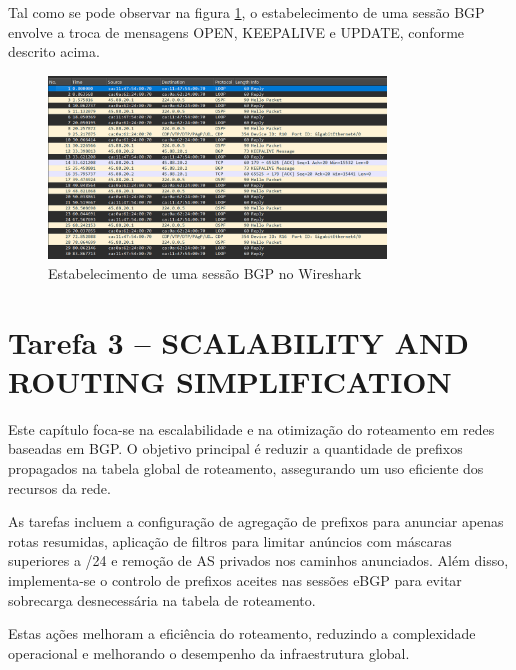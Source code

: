 \documentclass[11pt,english, openright, oneside]{book}
\begin{document}
\begin{enumerate}
  Tal como se pode observar na figura \ref{fig:wireshark}, o estabelecimento de uma sessão BGP envolve a troca de mensagens OPEN, KEEPALIVE e UPDATE, conforme descrito acima.
  \vspace{0.2cm}

  \begin{figure}[H]
    \centering
    \includegraphics[width=0.80\textwidth]{imagens/Tarefa2/8.wiresharkR16_R10.png}
    \caption{Estabelecimento de uma sessão BGP no Wireshark}
    \label{fig:wireshark}
  \end{figure}

\end{enumerate}
\pagebreak





\section{Tarefa 3 -- SCALABILITY AND ROUTING SIMPLIFICATION}
\vspace{0.2cm}

Este capítulo foca-se na escalabilidade e na otimização do roteamento em redes baseadas em BGP. O objetivo principal é reduzir a quantidade de prefixos propagados na tabela global de roteamento, assegurando um uso eficiente dos recursos da rede. 

As tarefas incluem a configuração de agregação de prefixos para anunciar apenas rotas resumidas, aplicação de filtros para limitar anúncios com máscaras superiores a /24 e remoção de AS privados nos caminhos anunciados. Além disso, implementa-se o controlo de prefixos aceites nas sessões eBGP para evitar sobrecarga desnecessária na tabela de roteamento. 

Estas ações melhoram a eficiência do roteamento, reduzindo a complexidade operacional e melhorando o desempenho da infraestrutura global.

\vspace{0.4cm}
\end{document}
